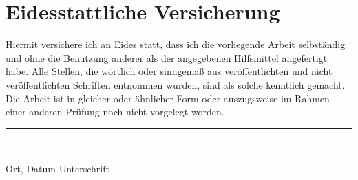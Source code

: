 \newpage
\thispagestyle{empty}
\section*{Eidesstattliche Versicherung}
Hiermit versichere ich an Eides statt, dass ich die vorliegende Arbeit selbständig und  ohne  die  Benutzung  anderer  als  der  angegebenen  Hilfsmittel  angefertigt habe.  Alle  Stellen,  die  wörtlich  oder  sinngemäß  aus  veröffentlichten  und  nicht veröffentlichten Schriften entnommen wurden, sind als solche kenntlich gemacht. Die  Arbeit  ist  in  gleicher  oder  ähnlicher  Form  oder  auszugsweise  im  Rahmen einer anderen Prüfung noch nicht vorgelegt worden.

\vspace*{1cm}

\rule{0.4\linewidth}{0.25pt}  \hfill \rule{0.4\linewidth}{0.25pt}\\
Ort, Datum \hfill Unterschrift\hspace*{9.1em}\\
